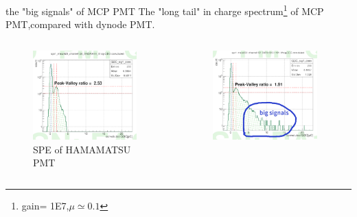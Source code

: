 \documentclass[11pt,compress,xcolor=x11names,UTF8]{beamer}
\begin{document}
\begin{frame}{the "big signals" of MCP PMT}
	The "long tail" in charge spectrum\footnote{gain= 1E7,$\mu\simeq 0.1$} of MCP PMT,compared with dynode PMT. 
\begin{columns}
\begin{column}{.485\textwidth}
\begin{figure}
\centering
\includegraphics[width=0.94\textwidth]{figure/hamtail.png} %
\caption{SPE of HAMAMATSU PMT}
\end{figure}
\end{column}
\begin{column}{.485\textwidth}
\begin{figure}
\centering
\includegraphics[width=0.94\textwidth]{figure/mcptail.png} %

\end{figure}
\end{column}
\end{columns}
\end{frame}
\end{document}
